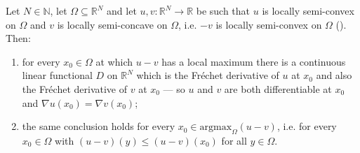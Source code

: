 \begin{theorem}
Let $N\in\mathbb N$, let $\Omega\subseteq\mathbb R^{N}$ and let
$u,v:\mathbb R^{N}\to\mathbb R$ be such that $u$ is locally semi-convex on $\Omega$ and $v$
is locally semi-concave on $\Omega$, i.e. $-v$ is locally semi-convex on $\Omega$
(). Then:
\begin{enumerate}
\item for every $x_0\in\Omega$ at which $u-v$ has a local maximum there is a continuous
  linear functional $D$ on $\mathbb R^{N}$ which is the Fr\'echet derivative of $u$ at $x_0$
  and also the Fr\'echet derivative of $v$ at $x_0$ --- so $u$ and $v$ are both
  differentiable at $x_0$ and $\nabla u(x_0)=\nabla v(x_0)$;
\item the same conclusion holds for every $x_0\in\mathrm{argmax}_\Omega(u-v)$, i.e. for every
  $x_0\in\Omega$ with $(u-v)(y)\le(u-v)(x_0)$ for all $y\in\Omega$.
\end{enumerate}
\end{theorem}
